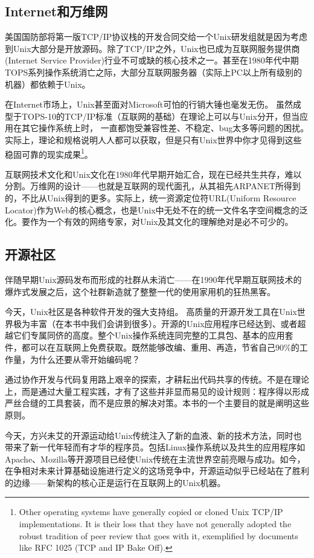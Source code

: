 \documentclass[12pt,oneside]{book}
\begin{document}
\subsection{Internet和万维网}
美国国防部将第一版TCP/IP协议栈的开发合同交给一个Unix研发组就是因为考虑到Unix大部分是开放源码。除了TCP/IP之外，Unix也已成为互联网服务提供商(Internet Service Provider)行业不可或缺的核心技术之一。甚至在1980年代中期TOPS系列操作系统消亡之际，大部分互联网服务器（实际上PC以上所有级别的机器）都依赖于Unix。

在Internet市场上，Unix甚至面对Microsoft可怕的行销大锤也毫发无伤。  虽然成型于TOPS-10的TCP/IP标准（互联网的基础）在理论上可以与Unix分开，但当应用在其它操作系统上时，  一直都饱受兼容性差、不稳定、bug太多等问题的困扰。实际上，理论和规格说明人人都可以获取，但是只有Unix世界中你才见得到这些稳固可靠的现实成果\footnote{Other operating systems have generally copied or cloned Unix TCP/IP implementations. It is their loss that they have not generally adopted the robust tradition of peer review that goes with it, exemplified by documents like RFC 1025 (TCP and IP Bake Off).}。

互联网技术文化和Unix文化在1980年代早期开始汇合，现在已经共生共存，难以分割。万维网的设计——也就是互联网的现代面孔，从其祖先ARPANET所得到的，不比从Unix得到的更多。实际上，统一资源定位符URL(Uniform Resource Locator)作为Web的核心概念，也是Unix中无处不在的统一文件名字空间概念的泛化。要作为一个有效的网络专家，对Unix及其文化的理解绝对是必不可少的。

\subsection{开源社区}
伴随早期Unix源码发布而形成的社群从未消亡——在1990年代早期互联网技术的爆炸式发展之后，这个社群新造就了整整一代的使用家用机的狂热黑客。

今天，Unix社区是各种软件开发的强大支持组。  高质量的开源开发工具在Unix世界极为丰富（在本书中我们会讲到很多）。开源的Unix应用程序已经达到、或者超越它们专属同侪的高度\cite{Fuzz}。整个Unix操作系统连同完整的工具包、基本的应用套件，都可以在互联网上免费获取。既然能够改编、重用、再造，节省自己90\%的工作量，为什么还要从零开始编码呢？

通过协作开发与代码复用路上艰辛的探索，才耕耘出代码共享的传统。不是在理论上，而是通过大量工程实践，才有了这些并非显而易见的设计规则：程序得以形成严丝合缝的工具套装，而不是应景的解决对策。本书的一个主要目的就是阐明这些原则。

今天，方兴未艾的开源运动给Unix传统注入了新的血液、新的技术方法，同时也带来了新一代年轻而有才华的程序员。包括Linux操作系统以及共生的应用程序如Apache、Mozilla等开源项目已经使Unix传统在主流世界空前亮眼与成功。如今，在争相对未来计算基础设施进行定义的这场竞争中，开源运动似乎已经站在了胜利的边缘——新架构的核心正是运行在互联网上的Unix机器。
\end{document}
